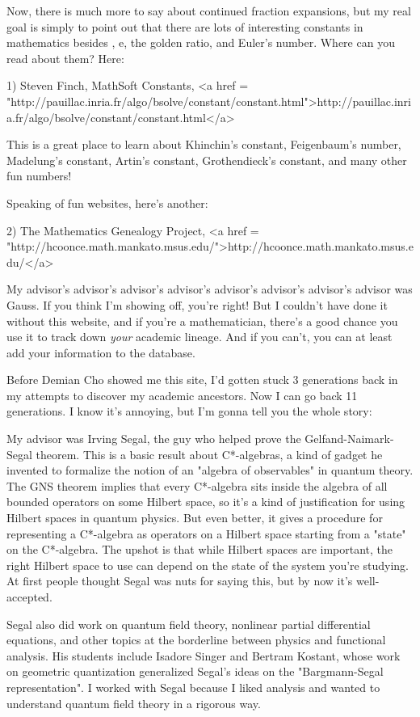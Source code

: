 Now, there is much more to say about continued fraction expansions,
but my real goal is simply to point out that there are lots of
interesting constants in mathematics besides \pi , e, the golden
ratio, and Euler's number.  Where can you read about them?  Here:

1) Steven Finch, MathSoft Constants,
<a href = "http://pauillac.inria.fr/algo/bsolve/constant/constant.html">http://pauillac.inria.fr/algo/bsolve/constant/constant.html</a>

This is a great place to learn about Khinchin's constant,
Feigenbaum's number, Madelung's constant, Artin's constant, 
Grothendieck's constant, and many other fun numbers!   

Speaking of fun websites, here's another:

2) The Mathematics Genealogy Project, <a href = "http://hcoonce.math.mankato.msus.edu/">http://hcoonce.math.mankato.msus.edu/</a>

My advisor's advisor's advisor's advisor's advisor's advisor's
advisor's advisor was Gauss.  If you think I'm showing off, you're
right!  But I couldn't have done it without this website, and if
you're a mathematician, there's a good chance you use it to track 
down \emph{your} academic lineage.  And if you can't, you can at least 
add your information to the database.

Before Demian Cho showed me this site, I'd gotten stuck 3 generations
back in my attempts to discover my academic ancestors.  Now I can go
back 11 generations.  I know it's annoying, but I'm gonna tell you the
whole story:

My advisor was Irving Segal, the guy who helped prove the
Gelfand-Naimark-Segal theorem.  This is a basic result about
C*-algebras, a kind of gadget he invented to formalize the notion of
an "algebra of observables" in quantum theory.  The GNS theorem
implies that every C*-algebra sits inside the algebra of all bounded
operators on some Hilbert space, so it's a kind of justification for
using Hilbert spaces in quantum physics.  But even better, it gives a
procedure for representing a C*-algebra as operators on a Hilbert
space starting from a "state" on the C*-algebra.  The upshot is that
while Hilbert spaces are important, the right Hilbert space to use can
depend on the state of the system you're studying.  At first people 
thought Segal was nuts for saying this, but by now it's well-accepted.

Segal also did work on quantum field theory, nonlinear partial
differential equations, and other topics at the borderline between
physics and functional analysis.  His students include Isadore Singer
and Bertram Kostant, whose work on geometric quantization generalized
Segal's ideas on the "Bargmann-Segal representation".  I worked with
Segal because I liked analysis and wanted to understand quantum field
theory in a rigorous way.  

